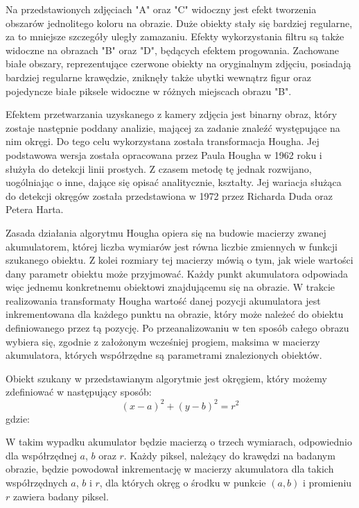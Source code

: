 Na przedstawionych zdjęciach "A" oraz "C" widoczny jest efekt tworzenia obszarów jednolitego koloru na obrazie. Duże obiekty stały się bardziej regularne, za to mniejsze szczegóły uległy zamazaniu. Efekty wykorzystania filtru są także widoczne na obrazach "B" oraz "D", będących efektem progowania. Zachowane białe obszary, reprezentujące czerwone obiekty na oryginalnym zdjęciu, posiadają bardziej regularne krawędzie, zniknęły także ubytki wewnątrz figur oraz pojedyncze białe piksele widoczne w różnych miejscach obrazu "B".

Efektem przetwarzania uzyskanego z kamery zdjęcia jest binarny obraz, który zostaje następnie poddany analizie, mającej za zadanie znaleźć występujące na nim okręgi. Do tego celu wykorzystana została transformacja Hougha. Jej podstawowa wersja została opracowana przez Paula Hougha w 1962 roku i służyła do detekcji linii prostych. Z czasem metodę tę jednak rozwijano, uogólniając o inne, dające się opisać analitycznie, kształty. Jej wariacja służąca do detekcji okręgów została przedstawiona w 1972 przez Richarda Duda oraz Petera Harta.

Zasada działania algorytmu Hougha opiera się na budowie macierzy zwanej akumulatorem, której liczba wymiarów jest równa liczbie zmiennych w funkcji szukanego obiektu. Z kolei rozmiary tej macierzy mówią o tym, jak wiele wartości dany parametr obiektu może przyjmować. Każdy punkt akumulatora odpowiada więc jednemu konkretnemu obiektowi znajdującemu się na obrazie. W trakcie realizowania transformaty Hougha wartość danej pozycji akumulatora jest inkrementowana dla każdego punktu na obrazie, który może należeć do obiektu definiowanego przez tą pozycję. Po przeanalizowaniu w ten sposób całego obrazu wybiera się, zgodnie z założonym wcześniej progiem, maksima w macierzy akumulatora, których współrzędne są parametrami znalezionych obiektów\cite{Sonka}.

Obiekt szukany w przedstawianym algorytmie jest okręgiem, który możemy zdefiniować w następujący sposób:
\begin{equation}
(x - a)^2 + (y - b)^2 = r^2
\label{eq:kolo}
\end{equation}
gdzie:
\begin{equationDescriptor}
\end{equationDescriptor}
W takim wypadku akumulator będzie macierzą o trzech wymiarach, odpowiednio dla współrzędnej $a$, $b$ oraz $r$. Każdy piksel, należący do krawędzi na badanym obrazie, będzie powodował inkrementację w macierzy akumulatora dla takich współrzędnych $a$, $b$ i $r$, dla których okręg o środku w punkcie $(a, b)$ i promieniu $r$ zawiera badany piksel.


